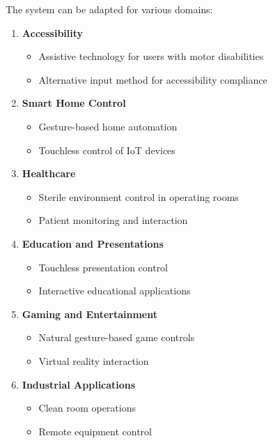\documentclass[12pt,a4paper]{report}
\begin{document}
The system can be adapted for various domains:

\begin{enumerate}
    \item \textbf{Accessibility}
    \begin{itemize}
        \item Assistive technology for users with motor disabilities
        \item Alternative input method for accessibility compliance
    \end{itemize}
    
    \item \textbf{Smart Home Control}
    \begin{itemize}
        \item Gesture-based home automation
        \item Touchless control of IoT devices
    \end{itemize}
    
    \item \textbf{Healthcare}
    \begin{itemize}
        \item Sterile environment control in operating rooms
        \item Patient monitoring and interaction
    \end{itemize}
    
    \item \textbf{Education and Presentations}
    \begin{itemize}
        \item Touchless presentation control
        \item Interactive educational applications
    \end{itemize}
    
    \item \textbf{Gaming and Entertainment}
    \begin{itemize}
        \item Natural gesture-based game controls
        \item Virtual reality interaction
    \end{itemize}
    
    \item \textbf{Industrial Applications}
    \begin{itemize}
        \item Clean room operations
        \item Remote equipment control
    \end{itemize}
\end{enumerate}
\end{document}
